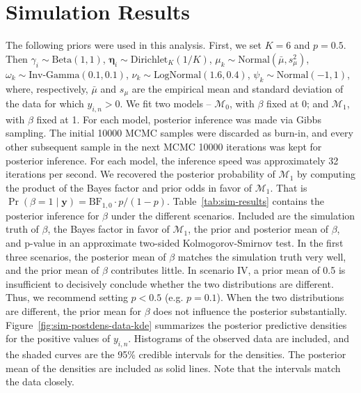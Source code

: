 \documentclass[12pt]{article} %
\newcommand{\Normal}{\text{Normal}}
\newcommand{\Beta}{\text{Beta}}
\newcommand{\InvGamma}{\text{Inv-Gamma}}
\newcommand{\Dirichlet}{\text{Dirichlet}}
\newcommand{\LogNormal}{\text{LogNormal}}
\begin{document}
\section{Simulation Results}\label{sec:sim-results}
The following priors were used in this analysis. First, we set $K=6$ and
$p=0.5$. Then $\gamma_i\sim\Beta(1, 1)$, $\bm\eta_i\sim\Dirichlet_K(1/K)$,
$\mu_k\sim\Normal(\bar{\mu}, s_\mu^2)$, $\omega_k\sim\InvGamma(0.1, 0.1)$,
$\nu_k\sim\LogNormal(1.6, 0.4)$, $\psi_k\sim\Normal(-1, 1)$, where,
respectively, $\bar{\mu}$ and $s_\mu$ are the empirical mean and standard
deviation of the data for which $y_{i,n} > 0$.
%
We fit two models -- $\mathcal{M}_0$, with $\beta$ fixed at 0; and
$\mathcal{M}_1$, with $\beta$ fixed at 1. For each model, posterior inference
was made via Gibbs sampling. The initial 10000 MCMC samples were discarded as
burn-in, and every other subsequent sample in the next MCMC 10000 iterations
was kept for posterior inference. For each model, the inference speed was
approximately 32 iterations per second. We recovered the posterior probability
of $\mathcal{M}_1$ by computing the product of the Bayes factor and prior
odds in favor of $\mathcal{M}_1$. That is $\Pr(\beta=1 \mid \bm y) =
\text{BF}_{1,0} \cdot p/(1-p)$.
%
%
Table~\ref{tab:sim-results} contains the posterior inference for $\beta$
under the different scenarios. Included are the simulation truth of $\beta$,
the Bayes factor in favor of $\mathcal{M}_1$, the prior and posterior mean of
$\beta$, and p-value in an approximate two-sided Kolmogorov-Smirnov test. In
the first three scenarios, the posterior mean of $\beta$ matches the
simulation truth very well, and the prior mean of $\beta$ contributes little.
In scenario IV, a prior mean of 0.5 is insufficient to decisively conclude
whether the two distributions are different. Thus, we recommend setting
$p<0.5$ (e.g. $p=0.1$). When the two distributions are different, the prior mean
for $\beta$ does not influence the posterior substantially.
%
Figure~\ref{fig:sim-postdens-data-kde} summarizes the posterior predictive
densities for the positive values of $y_{i,n}$. Histograms of the observed
data are included, and the shaded curves are the 95\% credible intervals for
the densities. The posterior mean of the densities are included as solid
lines. Note that the intervals match the data closely.
\end{document}
